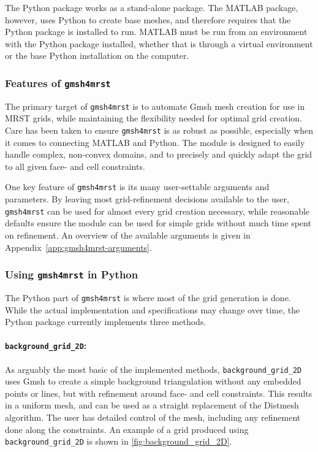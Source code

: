 The Python package works as a stand-alone package. The MATLAB package, however, uses Python to create base meshes, and therefore requires that the Python package is installed to run. MATLAB must be run from an environment with the Python package installed, whether that is through a virtual environment or the base Python installation on the computer.

\subsubsection{Features of \texttt{gmsh4mrst}}
The primary target of \verb|gmsh4mrst| is to automate Gmsh mesh creation for use in MRST grids, while maintaining the flexibility needed for optimal grid creation. Care has been taken to ensure \verb|gmsh4mrst| is as robust as possible, especially when it comes to connecting MATLAB and Python. The module is designed to easily handle complex, non-convex domains, and to precisely and quickly adapt the grid to all given face- and cell constraints.

One key feature of \verb|gmsh4mrst| is its many user-settable arguments and parameters. By leaving most grid-refinement decisions available to the user, \verb|gmsh4mrst| can be used for almost every grid creation necessary, while reasonable defaults ensure the module can be used for simple grids without much time spent on refinement. An overview of the available arguments is given in Appendix~\ref{app:gmsh4mrst-arguments}.

\subsubsection{Using \texttt{gmsh4mrst} in Python}
The Python part of \verb|gmsh4mrst| is where most of the grid generation is done. While the actual implementation and specifications may change over time, the Python package currently implements three methods.

\paragraph{\texttt{background\_grid\_2D}:}
As arguably the most basic of the implemented methods, \verb|background_grid_2D| uses Gmsh to create a simple background triangulation without any embedded points or lines, but with refinement around face- and cell constraints. This results in a uniform mesh, and can be used as a straight replacement of the Distmesh algorithm. The user has detailed control of the mesh, including any refinement done along the constraints. An example of a grid produced using \verb|background_grid_2D| is shown in \autoref{fig:background_grid_2D}.

